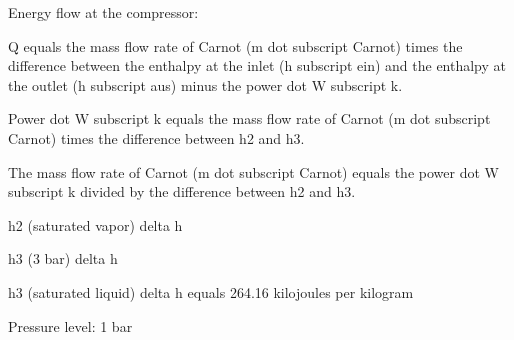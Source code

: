 Energy flow at the compressor:

Q equals the mass flow rate of Carnot (m dot subscript Carnot) times the difference between the enthalpy at the inlet (h subscript ein) and the enthalpy at the outlet (h subscript aus) minus the power dot W subscript k.

Power dot W subscript k equals the mass flow rate of Carnot (m dot subscript Carnot) times the difference between h2 and h3.

The mass flow rate of Carnot (m dot subscript Carnot) equals the power dot W subscript k divided by the difference between h2 and h3.

h2 (saturated vapor) delta h

h3 (3 bar) delta h

h3 (saturated liquid) delta h equals 264.16 kilojoules per kilogram

Pressure level: 1 bar